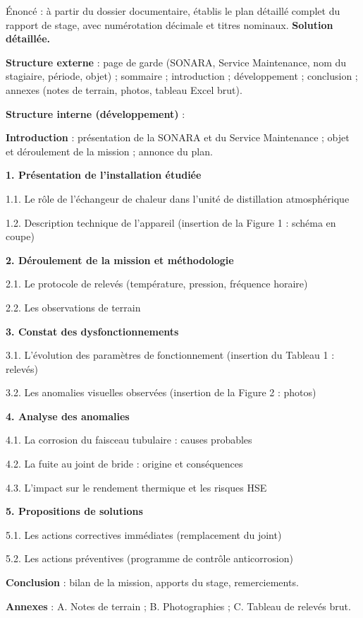 \documentclass[11pt]{article}
\begin{document}
\begin{exoresolu}
Énoncé : à partir du dossier documentaire, établis le plan détaillé complet du rapport de stage, avec numérotation décimale et titres nominaux.
\tcblower
\textbf{Solution détaillée.}

\textbf{Structure externe} : page de garde (SONARA, Service Maintenance, nom du stagiaire, période, objet) ; sommaire ; introduction ; développement ; conclusion ; annexes (notes de terrain, photos, tableau Excel brut).

\textbf{Structure interne (développement)} :

\textbf{Introduction} : présentation de la SONARA et du Service Maintenance ; objet et déroulement de la mission ; annonce du plan.

\textbf{1. Présentation de l'installation étudiée}

1.1. Le rôle de l'échangeur de chaleur dans l'unité de distillation atmosphérique

1.2. Description technique de l'appareil (insertion de la Figure 1 : schéma en coupe)

\textbf{2. Déroulement de la mission et méthodologie}

2.1. Le protocole de relevés (température, pression, fréquence horaire)

2.2. Les observations de terrain

\textbf{3. Constat des dysfonctionnements}

3.1. L'évolution des paramètres de fonctionnement (insertion du Tableau 1 : relevés)

3.2. Les anomalies visuelles observées (insertion de la Figure 2 : photos)

\textbf{4. Analyse des anomalies}

4.1. La corrosion du faisceau tubulaire : causes probables

4.2. La fuite au joint de bride : origine et conséquences

4.3. L'impact sur le rendement thermique et les risques HSE

\textbf{5. Propositions de solutions}

5.1. Les actions correctives immédiates (remplacement du joint)

5.2. Les actions préventives (programme de contrôle anticorrosion)

\textbf{Conclusion} : bilan de la mission, apports du stage, remerciements.

\textbf{Annexes} : A. Notes de terrain ; B. Photographies ; C. Tableau de relevés brut.
\end{exoresolu}
\end{document}
